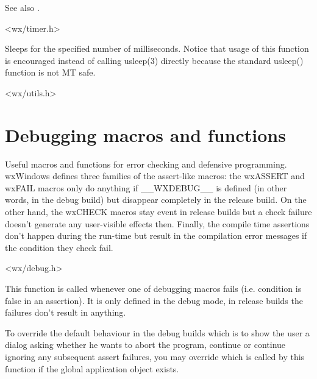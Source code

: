 See also .


<wx/timer.h>

\label{wxusleep}


Sleeps for the specified number of milliseconds. Notice that usage of this
function is encouraged instead of calling usleep(3) directly because the
standard usleep() function is not MT safe.


<wx/utils.h>

\section{Debugging macros and functions}\label{debugmacros}

Useful macros and functions for error checking and defensive programming.
wxWindows defines three families of the assert-like macros:
the wxASSERT and wxFAIL macros only do anything if \_\_WXDEBUG\_\_ is defined
(in other words, in the debug build) but disappear completely in the release
build. On the other hand, the wxCHECK macros stay event in release builds but a
check failure doesn't generate any user-visible effects then. Finally, the
compile time assertions don't happen during the run-time but result in the
compilation error messages if the condition they check fail.


<wx/debug.h>

\label{wxonassert}


This function is called whenever one of debugging macros fails (i.e. condition
is false in an assertion). It is only defined in the debug mode, in release
builds the  failures don't result in anything.

To override the default behaviour in the debug builds which is to show the user
a dialog asking whether he wants to abort the program, continue or continue
ignoring any subsequent assert failures, you may override 
 which is called by this function if
the global application object exists.

